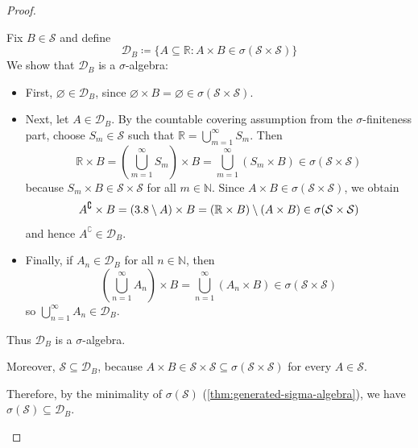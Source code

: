 \begin{proof}
\begin{itemize}[]
Fix \(B \in \mathcal{S}\) and define
\[
\mathcal{D}_B
\coloneq
\{A \subseteq \mathbb{R} : A \times B \in \sigma(\mathcal{S} \times \mathcal{S})\}
\]
We show that \(\mathcal{D}_B\) is a \(\sigma\)-algebra:
\begin{itemize}
\item
First, \(\varnothing \in \mathcal{D}_B\), since
\(\varnothing \times B = \varnothing \in \sigma(\mathcal{S} \times \mathcal{S})
\). \cmark
\item
Next, let \(A \in \mathcal{D}_B\). By the countable covering assumption from the
\(\sigma\)-finiteness part, choose \(S_m \in \mathcal{S}\) such that
\(\mathbb{R} = \bigcup_{m=1}^{\infty} S_m\).
Then
\[
\mathbb{R} \times B
=
\left(\bigcup_{m=1}^{\infty} S_m\right) \times B
=
\bigcup_{m=1}^{\infty} (S_m \times B)
\in
\sigma(\mathcal{S} \times \mathcal{S})
\]
because \(S_m \times B \in \mathcal{S} \times \mathcal{S}\) for all \(m \in \mathbb{N}\).
Since \(A \times B \in \sigma(\mathcal{S} \times \mathcal{S})\), we obtain
\[
A^{\complement} \times B
=
\left(3.8 \setminus A\right) \times B
=
(\mathbb{R} \times B) \setminus (A \times B)
\in
\sigma(\mathcal{S} \times \mathcal{S})
\]
and hence \(A^{\complement} \in \mathcal{D}_B\).
\cmark
\item
Finally, if \(A_n \in \mathcal{D}_B\) for all \(n \in \mathbb{N}\), then
\[
\left(\bigcup_{n=1}^{\infty} A_n\right) \times B
=
\bigcup_{n=1}^{\infty} (A_n \times B)
\in
\sigma(\mathcal{S} \times \mathcal{S})
\]
so \(\bigcup_{n=1}^{\infty} A_n \in \mathcal{D}_B\).
\cmark
\end{itemize}
Thus \(\mathcal{D}_B\) is a \(\sigma\)-algebra.

Moreover, \(\mathcal{S} \subseteq \mathcal{D}_B\), because \(A \times B \in \mathcal{S} \times \mathcal{S} \subseteq \sigma(\mathcal{S} \times \mathcal{S})\) for every \(A \in \mathcal{S}\).

Therefore, by the minimality of \(\sigma(\mathcal{S})\)
(\autoref{thm:generated-sigma-algebra}), we have
\(\sigma(\mathcal{S}) \subseteq \mathcal{D}_B\).


\end{itemize}
\end{proof}
